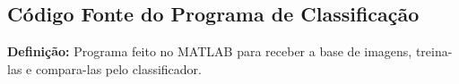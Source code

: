 
\begin{apendicesenv}

\renewcommand{\lstlistingname}{Código}
\chapter{Código Fonte do Programa de Classificação}
\label{CodigoA}

\textbf{\color{orange}Definição:} Programa feito no MATLAB para receber a base de imagens, treina-las e compara-las pelo classificador.



\end{apendicesenv}
